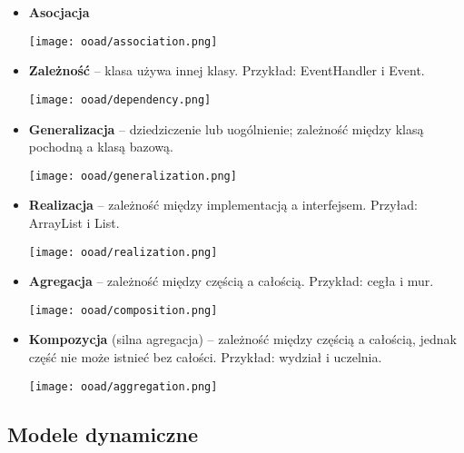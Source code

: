 \documentclass[main.tex]{subfiles}
\begin{document}
    \begin{itemize}[noitemsep]
        \item \textbf{Asocjacja}

        \begin{center}
            \texttt{[image: ooad/association.png]}
        \end{center}

        \item \textbf{Zależność} -- klasa używa innej klasy. Przykład: EventHandler i Event.
        \begin{center}
            \texttt{[image: ooad/dependency.png]}
        \end{center}

        \item \textbf{Generalizacja} -- dziedziczenie lub uogólnienie; zależność między klasą pochodną a klasą bazową.
        \begin{center}
            \texttt{[image: ooad/generalization.png]}
        \end{center}

        \item \textbf{Realizacja} -- zależność między implementacją a interfejsem. Przyład: ArrayList i List.

        \begin{center}
            \texttt{[image: ooad/realization.png]}
        \end{center}

        \item \textbf{Agregacja} -- zależność między częścią a całością. Przykład: cegła i mur.

        \begin{center}
            \texttt{[image: ooad/composition.png]}
        \end{center}

        \item \textbf{Kompozycja} (silna agregacja) -- zależność między częścią a całością, jednak część nie może
        istnieć bez całości. Przykład: wydział i uczelnia.

        \begin{center}
            \texttt{[image: ooad/aggregation.png]}
        \end{center}
    \end{itemize}

    \subsection{Modele dynamiczne}
\end{document}
